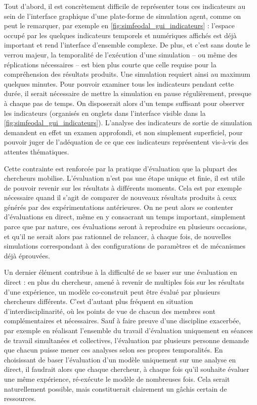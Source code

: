 	Tout d'abord, il est concrètement difficile de représenter tous ces indicateurs au sein de l'interface graphique d'une plate-forme de simulation agent, comme on peut le remarquer, par exemple en \cref{fig:simfeodal_gui_indicateurs} : l'espace occupé par les quelques indicateurs temporels et numériques affichés est déjà important et rend l'interface d'ensemble complexe.
	De plus, et c'est sans doute le verrou majeur, la temporalité de l'exécution d'une simulation -- ou même des réplications nécessaires -- est bien plus courte que celle requise pour la compréhension des résultats produits.
	Une simulation requiert ainsi au maximum quelques minutes.
	Pour pouvoir examiner tous les indicateurs pendant cette durée, il serait nécessaire de mettre la simulation en pause régulièrement, presque à chaque pas de temps.
	On disposerait alors d'un temps suffisant pour observer les indicateurs (organisés en onglets dans l'interface visible dans la \cref{fig:simfeodal_gui_indicateurs}).
	L'analyse des indicateurs de sortie de simulation demandent en effet un examen approfondi, et non simplement superficiel, pour pouvoir juger de l'adéquation de ce que ces indicateurs représentent vis-à-vis des attentes thématiques.
	
	Cette contrainte est renforcée par la pratique d'évaluation que la plupart des chercheurs mobilise.
	L'évaluation n'est pas une étape unique et finie, il est utile de pouvoir revenir sur les résultats à différents moments.
	Cela est par exemple nécessaire quand il s'agit de comparer de nouveaux résultats produits à ceux générés par des expérimentations antérieures.
	On ne peut alors se contenter d'évaluations en direct, même en y consacrant un temps important, simplement parce que par nature, ces évaluations seront à reproduire en plusieurs occasions, et qu'il ne serait alors pas rationnel de relancer, à chaque fois, de nouvelles simulations correspondant à des configurations de paramètres et de mécanismes déjà éprouvées.
	
	Un dernier élément contribue à la difficulté de se baser sur une évaluation en direct : en plus du chercheur, amené à revenir de multiples fois sur les résultats d'une expérience, un modèle co-construit peut être évalué par plusieurs chercheurs différents.
	C'est d'autant plus fréquent en situation d'interdisciplinarité, où les points de vue de chacun des membres sont complémentaires et nécessaires.
	Sauf à faire preuve d'une discipline exacerbée, par exemple en réalisant l'ensemble du travail d'évaluation uniquement en séances de travail simultanées et collectives, l'évaluation par plusieurs personne demande que chacun puisse mener ces analyses selon ses propres temporalités.
	En choisissant de baser l'évaluation d'un modèle uniquement sur une analyse en direct, il faudrait alors que chaque chercheur, à chaque fois qu'il souhaite évaluer une même expérience, ré-exécute le modèle de nombreuses fois.
	Cela serait naturellement possible, mais constituerait clairement un gâchis certain de ressources.
	
